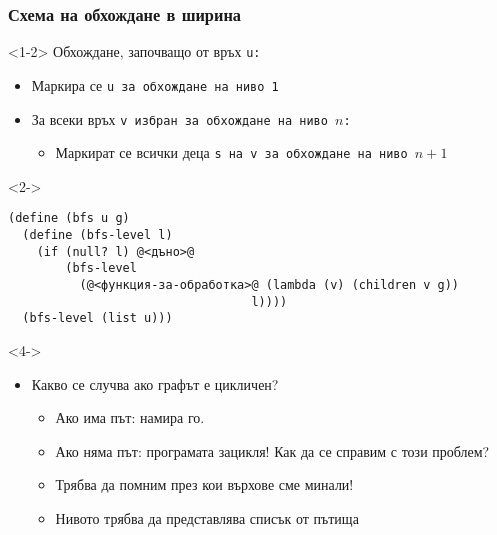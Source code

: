 \documentclass[alsotrans]{beamerswitch}
\begin{document}
\begin{frame}[fragile]
  \frametitle{Схема на обхождане в ширина}
  \begin{onlyenv}<1-2>
    Обхождане, започващо от връх \tt u:
    \begin{itemize}
    \item Маркира се \tt u за обхождане на ниво 1
    \item За всеки връх \tt v избран за обхождане на ниво $n$:
      \begin{itemize}
      \item Маркират се всички деца \tt s на \tt v за обхождане на
        ниво $n+1$
      \end{itemize}
    \end{itemize}
  \end{onlyenv}%
  \begin{visibleenv}<2->%
    \small%
\begin{lstlisting}
(define (bfs u g)
  (define (bfs-level l)
    (if (null? l) @<дъно>@
        (bfs-level
          (@<функция-за-обработка>@ (lambda (v) (children v g))
                                  l))))
  (bfs-level (list u)))
\end{lstlisting}
  \end{visibleenv}
  \begin{onlyenv}<4->
    \begin{itemize}[<+(4)->]
    \item \alert{Какво се случва ако графът е цикличен?}
      \begin{itemize}
      \item Ако има път: намира го.
      \item Ако няма път: програмата зацикля! Как да се справим с този проблем?
      \item Трябва да помним през кои върхове сме минали!
      \item Нивото трябва да представлява \alert{списък от пътища}
      \end{itemize}
    \end{itemize}
  \end{onlyenv}
\end{frame}
\end{document}
